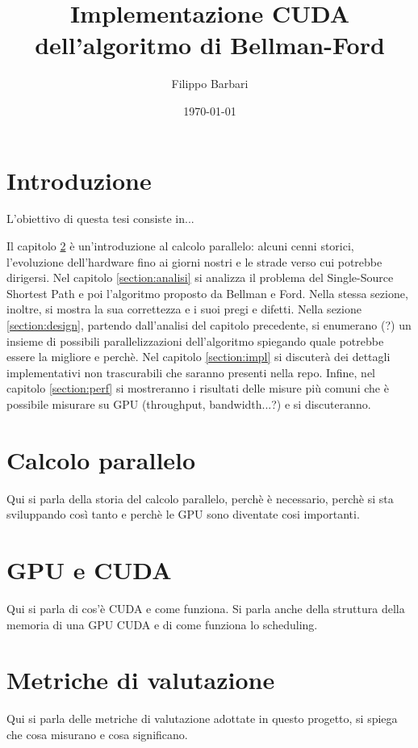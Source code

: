 \documentclass{article}
\title{Implementazione CUDA dell'algoritmo di Bellman-Ford}
\author{Filippo Barbari}
\date{\today}
\begin{document}
	
	\maketitle
	\newpage
	
	\tableofcontents
	\newpage
	
	\listoffigures
	\newpage
	
	\listoftables
	\newpage
	
	\listofalgorithms
	\newpage
	
	\section{Introduzione}
	L'obiettivo di questa tesi consiste in...
	
	Il capitolo \ref{section:storia} è un'introduzione al calcolo parallelo: alcuni cenni storici, l'evoluzione dell'hardware fino ai giorni nostri e le strade verso cui potrebbe dirigersi. Nel capitolo \ref{section:analisi} si analizza il problema del Single-Source Shortest Path e poi l'algoritmo proposto da Bellman e Ford. Nella stessa sezione, inoltre, si mostra la sua correttezza e i suoi pregi e difetti. Nella sezione \ref{section:design}, partendo dall'analisi del capitolo precedente, si enumerano (?) un insieme di possibili parallelizzazioni dell'algoritmo spiegando quale potrebbe essere la migliore e perchè. Nel capitolo \ref{section:impl} si discuterà dei dettagli implementativi non trascurabili che saranno presenti nella repo. Infine, nel capitolo \ref{section:perf} si mostreranno i risultati delle misure più comuni che è possibile misurare su GPU (throughput, bandwidth...?) e si discuteranno.
	
	\section{Calcolo parallelo}
	\label{section:storia}
	Qui si parla della storia del calcolo parallelo, perchè è necessario, perchè si sta sviluppando così tanto e perchè le GPU sono diventate cosi importanti.
	
	\section{GPU e CUDA}
	\label{section:cuda}
	Qui si parla di cos'è CUDA e come funziona. Si parla anche della struttura della memoria di una GPU CUDA e di come funziona lo scheduling.
	
	\section{Metriche di valutazione}
	\label{section:metriche}
	Qui si parla delle metriche di valutazione adottate in questo progetto, si spiega che cosa misurano e cosa significano.
	
\end{document}
